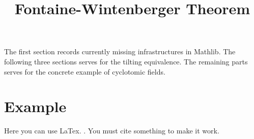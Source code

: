 \title{Fontaine-Wintenberger Theorem}




\maketitle


\tableofcontents

The first section records currently missing infrastructures in Mathlib. The following three sections serves for the tilting equivalence. The remaining parts serves for the concrete example of cyclotomic fields.











\section{Example}
Here you can use LaTex. \cite{marcus}. You must cite something to make it work.

%
